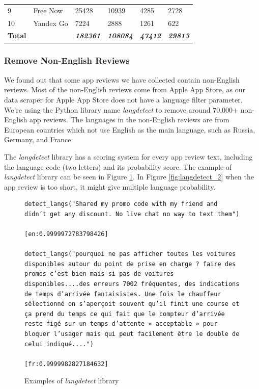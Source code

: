 \documentclass[12pt]{article}
\begin{document}
\begin{table}[!h]
\begin{tabular}{llllll}
9              & Free Now         & 25428                    & 10939                         & 4285                             & 2728                               \\
10             & Yandex Go        & 7224                     & 2888                          & 1261                             & 622                                \\
\hline
\textbf{Total} &                  & \textbf{\textit{182361}} & \textbf{\textit{108084}}      & \textbf{\textit{47412}}          & \textbf{\textit{29813}}           \\
\hline
\end{tabular}
\label{tab:preprocessing_result}
\end{table}
\subsubsection{Remove Non-English Reviews}
We found out that some app reviews we have collected contain non-English reviews. Most of the non-English reviews come from Apple App Store, as our data scraper for Apple App Store does not have a language filter parameter. We’re using the Python library name \textit{langdetect}\cite{langdetect} to remove around 70,000+ non-English app reviews. The languages in the non-English reviews are from European countries which not use English as the main language, such as Russia, Germany, and France.

The \textit{langdetect} library has a scoring system for every app review text, including the language code (two letters) and its probability score. The example of \textit{langdetect} library can be seen in Figure \ref{fig:langdetect_1}. In Figure \ref{fig:langdetect_2} when the app review is too short, it might give multiple language probability.

\begin{figure}[!h]
\begin{lstlisting}
detect_langs("Shared my promo code with my friend and didn’t get any discount. No live chat no way to text them")

[en:0.9999972783798426]

detect_langs("pourquoi ne pas afficher toutes les voitures disponibles autour du point de prise en charge ? faire des promos c’est bien mais si pas de voitures disponibles....des erreurs 7002 fréquentes, des indications de temps d’arrivée fantaisistes. Une fois le chauffeur sélectionné on s’aperçoit souvent qu’il finit une course et ça prend du temps ce qui fait que le compteur d’arrivée reste figé sur un temps d’attente « acceptable » pour bloquer l’usager mais qui peut facilement être le double de celui indiqué....")

[fr:0.9999982827184632]
\end{lstlisting}
\caption{Examples of \textit{langdetect} library}
\label{fig:langdetect_1}
\end{figure}
\end{document}
